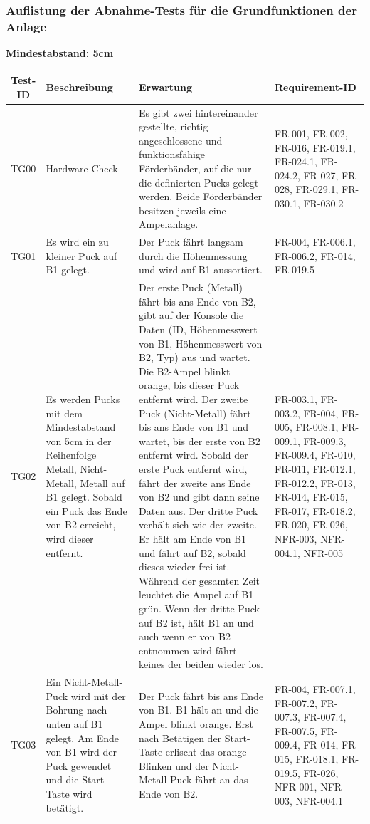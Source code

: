 \documentclass[oneside,a4paper,titlepage]{scrartcl}              %
\begin{document}
\subsubsection{Auflistung der Abnahme-Tests für die Grundfunktionen der Anlage}
\textbf{Mindestabstand: 5cm}
\begin{small}
  \begin{center}
    \begin{longtable}{|c|p{4cm}|p{6cm}|C{3cm}|}
      \hline
      \textbf{Test-ID} & \textbf{Beschreibung} & \textbf{Erwartung} & \textbf{Requirement-ID}\\
      \toprule
      \endhead
      \hline
      TG00 & Hardware-Check & Es gibt zwei hintereinander gestellte, richtig angeschlossene
      und funktionsfähige Förderbänder, auf die nur die definierten Pucks gelegt werden.
      Beide Förderbänder besitzen jeweils eine Ampelanlage. & FR-001, FR-002, FR-016, FR-019.1, FR-024.1, FR-024.2, FR-027, FR-028, FR-029.1, FR-030.1, FR-030.2\\
      \hline
       TG01 & Es wird ein zu kleiner Puck auf B1 gelegt. & Der Puck fährt langsam durch die Höhenmessung und wird auf B1 aussortiert. & FR-004, FR-006.1, FR-006.2, FR-014, FR-019.5\\
      \hline
      TG02 & Es werden Pucks mit dem Mindestabstand von 5cm in der Reihenfolge Metall, Nicht-Metall, Metall auf B1 gelegt. Sobald ein Puck das Ende von B2 erreicht, wird dieser entfernt. & Der erste Puck (Metall) fährt bis ans Ende von B2, gibt auf der Konsole die Daten (ID, Höhenmesswert von B1, Höhenmesswert von B2, Typ) aus und wartet.
      Die B2-Ampel blinkt orange, bis dieser Puck entfernt wird.
      Der zweite Puck (Nicht-Metall) fährt bis ans Ende von B1 und wartet, bis der erste von B2 entfernt wird.
      Sobald der erste Puck entfernt wird, fährt der zweite ans Ende von B2 und gibt dann seine Daten aus.
      Der dritte Puck verhält sich wie der zweite. Er hält am Ende von B1 und fährt auf B2, sobald dieses wieder frei ist. Während der gesamten Zeit leuchtet die Ampel auf B1 grün.
      Wenn der dritte Puck auf B2 ist, hält B1 an und auch wenn er von B2 entnommen wird fährt keines der beiden wieder los. & FR-003.1, FR-003.2, FR-004, FR-005, FR-008.1, FR-009.1, FR-009.3, FR-009.4, FR-010, FR-011, FR-012.1, FR-012.2, FR-013, FR-014, FR-015, FR-017, FR-018.2, FR-020, FR-026, NFR-003, NFR-004.1, NFR-005\\
      \hline
       TG03 & Ein Nicht-Metall-Puck wird mit der Bohrung nach unten auf B1 gelegt. Am Ende von B1 wird der Puck gewendet und die Start-Taste wird betätigt. & Der Puck fährt bis ans Ende von B1. B1 hält an und die Ampel blinkt orange. Erst nach Betätigen der Start-Taste erlischt das orange Blinken und der Nicht-Metall-Puck fährt an das Ende von B2. & FR-004, FR-007.1, FR-007.2, FR-007.3, FR-007.4, FR-007.5, FR-009.4, FR-014, FR-015, FR-018.1, FR-019.5, FR-026, NFR-001, NFR-003, NFR-004.1\\

\end{longtable}
\end{center}
\end{small}
\end{document}
